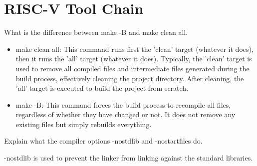 \documentclass{article}
\begin{document}
\begin{titlepage}
    \centering

    
\end{titlepage}
\clearpage


\tableofcontents
\clearpage
\listoftables
\listoffigures


\clearpage

\newpage




\section{RISC-V Tool Chain}

What is the difference between make -B and make clean all.

\begin{itemize}
    \item make clean all: This command runs first the 'clean' target (whatever it does), then it runs
    the 'all' target (whatever it does). Typically, the 'clean' target is used to remove all compiled
    files and intermediate files generated during the build process, effectively cleaning the project
    directory. After cleaning, the 'all' target is executed to build the project from scratch.
    \item make -B: This command forces the build process to recompile all files, regardless of whether
    they have changed or not. It does not remove any existing files but simply rebuilds everything.
\end{itemize}

Explain what the compiler options -nostdlib and -nostartfiles do.

-nostdlib is used to prevent the linker from linking against the standard libraries.








\newpage %
\end{document}
